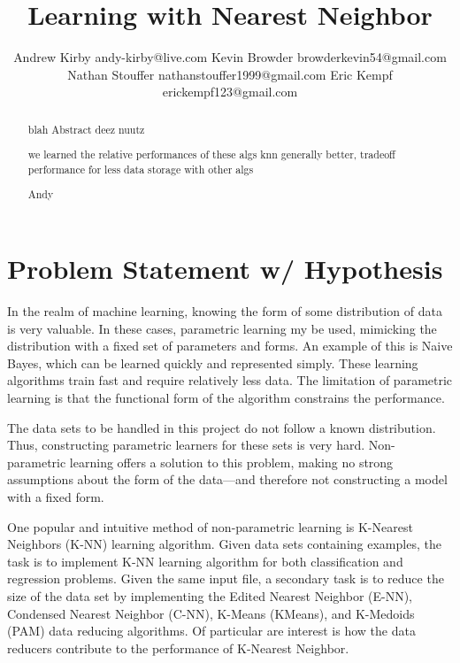 \documentclass[twoside,11pt]{article}
\begin{document}
\title{Learning with Nearest Neighbor}

\author{\name Andrew Kirby \email andy-kirby@live.com \AND
		\name Kevin Browder \email browderkevin54@gmail.com \AND
		\name Nathan Stouffer \email nathanstouffer1999@gmail.com \AND
		\name Eric Kempf \email erickempf123@gmail.com }

\maketitle

\begin{abstract}
	blah Abstract deez nuutz
	
	we learned the relative performances of these algs
	knn generally better, tradeoff performance for less data storage with other algs
	
	Andy 
	
\end{abstract}

\section{Problem Statement w/ Hypothesis}

In the realm of machine learning, knowing the form of some distribution of data is very valuable. In these cases, parametric learning my be used, mimicking the distribution with a fixed set of parameters and forms. An example of this is Naive Bayes, which can be learned quickly and represented simply. These learning algorithms train fast and require relatively less data. The limitation of parametric learning is that the functional form of the algorithm constrains the performance.

The data sets to be handled in this project do not follow a known distribution. Thus, constructing parametric learners for these sets is very hard. Non-parametric learning offers a solution to this problem, making no strong assumptions about the form of the data---and therefore not constructing a model with a fixed form. 

One popular and intuitive method of non-parametric learning is K-Nearest Neighbors (K-NN) learning algorithm. Given data sets containing examples, the task is to implement K-NN learning algorithm for both classification and regression problems. Given the same input file, a secondary task is to reduce the size of the data set by implementing the Edited Nearest Neighbor (E-NN), Condensed Nearest Neighbor (C-NN), K-Means (KMeans), and K-Medoids (PAM) data reducing algorithms. Of particular are interest is how the data reducers contribute to the performance of K-Nearest Neighbor.
\end{document}
